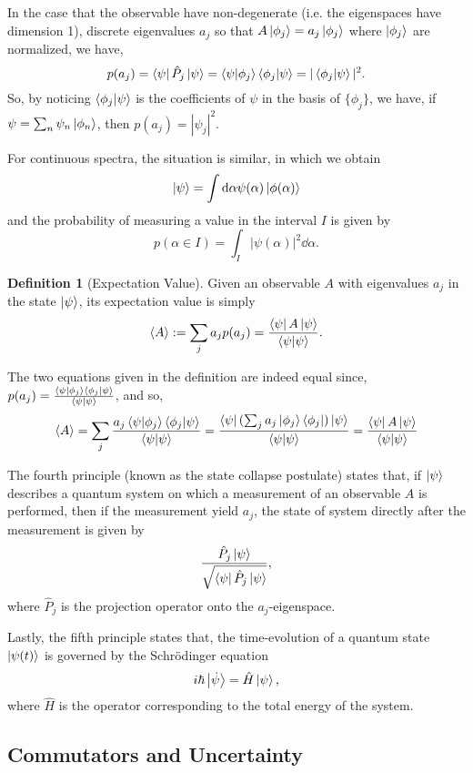 \documentclass[]{article}
\theoremstyle{definition}
\theoremstyle{definition}
\newtheorem{definition}{Definition}[section]
\begin{document}
In the case that the observable have non-degenerate (i.e. the eigenspaces have 
dimension 1), discrete eigenvalues \(a_j\) so that 
\(A\ket{\phi_j} = a_j \ket{\phi_j}\) where \(\ket{\phi_j}\) are normalized, 
we have, 
\[p(a_j) = \bra{\psi} \hat P_j \ket{\psi} = 
  \bra{\psi}\ket{\phi_j}\bra{\phi_j}\ket{\psi} = 
  |\bra{\phi_j}\ket{\psi}|^2.\]
So, by noticing \(\bra{\phi_j}\ket{\psi}\) is the coefficients of \(\psi\) 
in the basis of \(\{\phi_j\}\), we have, if \(\psi = \sum_n \psi_n \ket{\phi_n}\), 
then \(p(a_j) = |\psi_j|^2\). 

For continuous spectra, the situation is similar, in which we obtain 
\[\ket{\psi} = \int \dd \alpha \psi(\alpha) \ket{\phi(\alpha)}\]
and the probability of measuring a value in the interval \(I\) is given by 
\[p(\alpha \in I) = \int_I |\psi(\alpha)|^2 \dd \alpha.\]

\begin{definition}[Expectation Value]
  Given an observable \(A\) with eigenvalues \(a_j\) in the state 
  \(\ket{\psi}\), its expectation value is simply 
  \[\langle A \rangle := \sum_j a_j p(a_j) = 
  \frac{\bra{\psi} A \ket{\psi}}{\bra{\psi}\ket{\psi}}.\] 
\end{definition}
The two equations given in the definition are indeed equal since, 
\(p(a_j) = \frac{\bra{\psi}\ket{\phi_j}\bra{\phi_j}\ket{\psi}}{\bra{\psi}\ket{\psi}}\),
and so,
\[\langle A \rangle = \sum_j 
  \frac{a_j\bra{\psi}\ket{\phi_j}\bra{\phi_j}\ket{\psi}}{\bra{\psi}\ket{\psi}}
  = \frac{\bra{\psi}(\sum_j a_j \ket{\phi_j}\bra{\phi_j})\ket{\psi}}{\bra{\psi}\ket{\psi}}
  = \frac{\bra{\psi} A \ket{\psi}}{\bra{\psi}\ket{\psi}}\]

The fourth principle (known as the state collapse postulate) states that, 
if \(\ket{\psi}\) describes a quantum system on which a measurement of an 
observable \(A\) is performed, then if the measurement yield \(a_j\), the 
state of system directly after the measurement is given by 
\[\frac{\hat P_j\ket{\psi}}{\sqrt{\bra{\psi}\hat P_j \ket{\psi}}},\]
where \(\hat P_j\) is the projection operator onto the \(a_j\)-eigenspace.

Lastly, the fifth principle states that, the time-evolution of a quantum state 
\(\ket{\psi(t)}\) is governed by the Schrödinger equation 
\[i \hbar \ket{\dot \psi} = \hat H \ket{\psi},\]
where \(\hat H\) is the operator corresponding to the total energy of the system.

\subsection{Commutators and Uncertainty}
\end{document}
